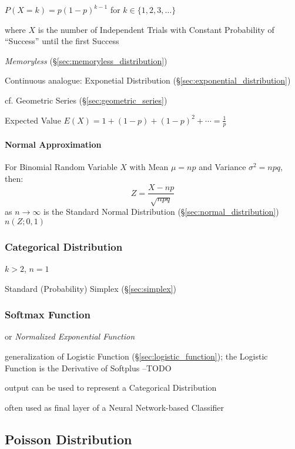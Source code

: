 $P(X = k) = p(1-p)^{k-1}$ for $k \in \{1, 2, 3, \ldots\}$

where $X$ is the number of Independent Trials with Constant Probability of
``Success'' until the first Success

\emph{Memoryless} (\S\ref{sec:memoryless_distribution})

\fist Continuous analogue: Exponetial Distribution
(\S\ref{sec:exponential_distribution})

cf. Geometric Series (\S\ref{sec:geometric_series})

Expected Value $E(X) = 1 + (1-p) + (1-p)^2 + \cdots = \frac{1}{p}$



\paragraph{Normal Approximation}\label{sec:normal_approximation}\hfill

For Binomial Random Variable $X$ with Mean $\mu = np$ and Variance
$\sigma^2 = npq$, then:
\[
  Z = \frac{X - np}{\sqrt{npq}}
\]
as $n \to \infty$ is the Standard Normal Distribution
(\S\ref{sec:normal_distribution}) $n(Z;0,1)$



\subsubsection{Categorical Distribution}\label{sec:categorical_distribution}

$k > 2$, $n = 1$

Standard (Probability) Simplex (\S\ref{sec:simplex})



\subsubsection{Softmax Function}\label{sec:softmax}

or \emph{Normalized Exponential Function}

generalization of Logistic Function (\S\ref{sec:logistic_function}); the
Logistic Function is the Derivative of Softplus --TODO

output can be used to represent a Categorical Distribution

often used as final layer of a Neural Network-based Classifier


\subsection{Poisson Distribution}\label{sec:poisson_distribution}

